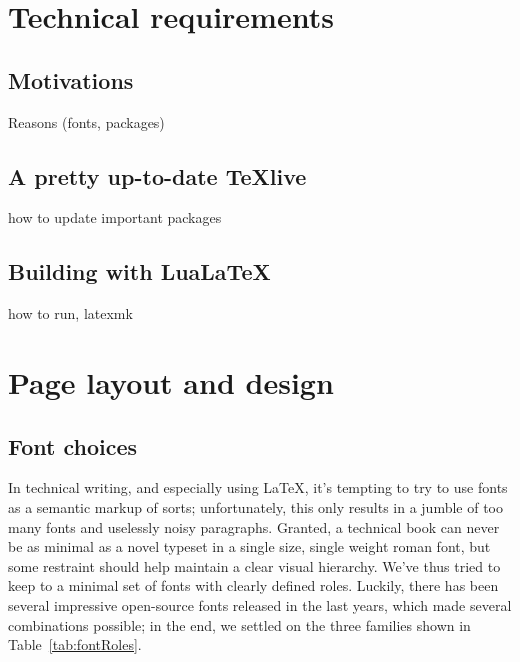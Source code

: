 \documentclass[english,twoside,openany,showtrims]{sbabook}
\begin{document}
\tableofcontents*

\clearpage
\listoffigures
\listoftables
\lstlistoflistings

\mainmatter


\chapter{Technical requirements}


\section{Motivations}

Reasons (fonts, packages)


\section{A pretty up-to-date TeXlive}

how to update
important packages


\section{Building with Lua\LaTeX}

how to run, latexmk


\chapter{Page layout and design}


\section{Font choices}

In technical writing, and especially using \LaTeX{}, it's tempting to try to use
fonts as a semantic markup of sorts; unfortunately, this only results in a
jumble of too many fonts and uselessly noisy paragraphs.
Granted, a technical book can never be as minimal as a novel typeset in a single
size, single weight roman font, but some restraint should help maintain a clear
visual hierarchy.
We've thus tried to keep to a minimal set of fonts with clearly defined roles.
Luckily, there has been several impressive
open-source fonts released in the last years, which made several combinations
possible; in the end, we settled on the three families shown in
Table~\ref{tab:fontRoles}.
\end{document}
